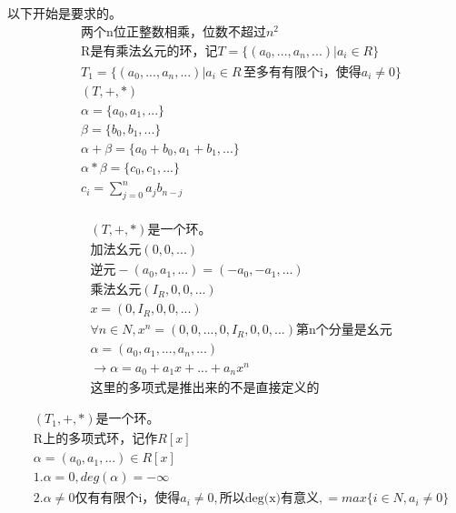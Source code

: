 \documentclass[12pt, a4paper]{article}  %
\begin{document}
以下开始是要求的。
\begin{align}
    &\text{两个n位正整数相乘，位数不超过}n^2\\
    &\text{R是有乘法幺元的环，记}T=\{(a_0,...,a_n,...)|a_i\in R\}\\
    &T_1=\{(a_0,...,a_n,...)|a_i\in R\,\text{至多有有限个i，使得}a_i\neq 0\}\\
    &(T,+,*)\\
    &\alpha=\{a_0,a_1,...\}\\
    &\beta=\{b_0,b_1,...\}\\
    &\alpha+\beta=\{a_0+b_0,a_1+b_1,...\}\\
    &\alpha*\beta=\{c_0,c_1,...\}\\
    &c_i=\sum_{j=0}^n a_jb_{n-j}\\
\end{align}

\begin{align}
    &(T,+,*)\text{是一个环。}\\
    &\text{加法幺元}(0,0,...)\\
    &\text{逆元}-(a_0,a_1,...)=(-a_0,-a_1,...)\\
    &\text{乘法幺元}(I_R,0,0,...)\\
    &x=(0,I_R,0,0,...)\\
    &\forall n\in N,x^n=(0,0,...,0,I_R,0,0,...)\text{第n个分量是幺元}\\
    &\alpha=(a_0,a_1,...,a_n,...)\\
    &\rightarrow \alpha=a_0+a_1x+...+a_nx^n\\
    &\text{这里的多项式是推出来的不是直接定义的}
\end{align}

\begin{align}
    &(T_1,+,*)\text{是一个环。}\\
    &\text{R上的多项式环，记作}R[x]\\
    &\alpha=(a_0,a_1,...)\in R[x]\\
    &1.\alpha=0,deg(\alpha)=-\infty\\
    &2.\alpha \neq 0\text{仅有有限个i，使得}a_i\neq 0,\text{所以deg(x)有意义},=max\{i\in N,a_i\neq 0\}\\
\end{align}
\end{document}
